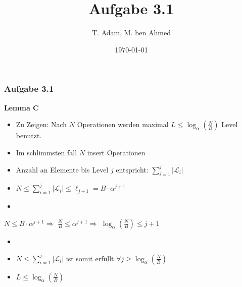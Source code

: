 \documentclass[aspectratio=169]{beamer}
\title[Aufgabe 1.1]{Aufgabe 3.1} %
\author{T. Adam, M. ben Ahmed} %
\institute[UOS] %
{

Universität Osnabrück \\ %

\medskip
\textit{Æ} %


}
\date{\today} %
\begin{document}
\begin{frame}
\titlepage %
\end{frame}





\begin{frame}
	\frametitle{Aufgabe 3.1}
	
	\textbf{Lemma C}
	\begin{itemize}
		\item Zu Zeigen: Nach $N$ Operationen werden maximal $L \leq \log_{\alpha}(\frac{N}{B})$ Level benutzt.
		\item Im schlimmsten fall $N$ insert Operationen
		\item Anzahl an Elemente bis Level $j$ entspricht: $ \sum_{i = 1}^{j} |\mathcal{L}_i|$
		\item $N \leq \sum_{i = 1}^{j} |\mathcal{L}_i| \leq \ell_{j+1} = B \cdot \alpha^{j+1}$
		\item[]
	\end{itemize}

		\quad $N \leq B \cdot \alpha^{j+1} \Rightarrow$ 
		$\frac{N}{B} \leq \alpha^{j+1} \Rightarrow$
		$\log_{\alpha}(\frac{N}{B}) \leq j + 1$ 
		
	\begin{itemize}
		\item[]
		\item $N \leq \sum_{i = 1}^{j} |\mathcal{L}_i|$ ist somit erfüllt $\forall j \geq \log_{\alpha}(\frac{N}{B})$
		\item $L \leq \log_{\alpha}(\frac{N}{B})$
	\end{itemize}

	
		
	
	\end{frame}
\end{document}
